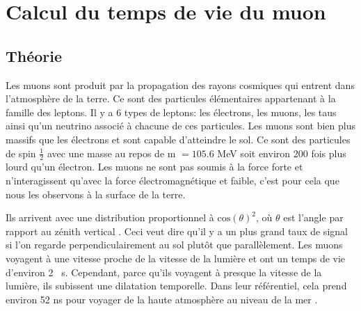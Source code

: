 \documentclass[12pt]{article}
\begin{document}
\begin{abstract}

La plupart des particules observées en dehors de notre atmosphère ont été crées par des sources galactiques, voir extra-galactiques. Si leurs énergies dépassent le  keV, celles-ci vont alors heurter la terre. La plupart des rayons cosmiques sont de nature hadronique et donc sensitifs à l'interaction forte. L'atmosphère terrestre est alors un vrai champ de mine pour ces particules qui sont susceptible d'interagir à tout moment produisant des gerbes de particules neutres et chargées. Puis, à leur tour, interagissent résultant en une pléthore de mésons chargées avec des temps de vie courts qui éventuellement se désintègrent en un grand nombre de muons de hautes énergies. À la surface de la terre, nous sommes bombardés par des muons de charges positives et négatives avec un taux d'environ une particule par \si{\cm\squared\per\min}. Dans cette expérience, nous allons nous intéresser à  ces particules cosmiques et nous allons mesurer leurs temps de vie ainsi leurs flux.

\end{abstract}

\newpage
\section{Calcul du temps de vie du muon}
\subsection{Théorie}

Les muons sont produit par la propagation des rayons cosmiques qui entrent dans l'atmosphère de la terre. Ce sont des particules élémentaires appartenant à la famille des leptons. Il y a 6 types de leptons: les électrons, les muons, les taus ainsi qu'un neutrino associé à chacune de ces particules. Les muons sont bien plus massifs que les électrons et sont capable d'atteindre le sol. Ce sont des particules de spin $\frac{1}{2}$ avec une masse au repos de m $=105.6$ MeV soit environ 200 fois plus lourd qu'un électron. Les muons ne sont pas soumis à la force forte et n'interagissent qu'avec la force électromagnétique et faible, c'est pour cela que nous les observons à la surface de la terre.

Ils arrivent avec une distribution proportionnel à $\text{cos}(\theta)^2$, où $\theta$ est l'angle par rapport au zénith vertical \cite{PhysRevD.98.030001}. Ceci veut dire qu'il y a un plus grand taux de signal si l'on regarde perpendiculairement au sol plutôt que parallèlement. Les muons voyagent à une vitesse proche de la vitesse de la lumière et ont un temps de vie d'environ 2 \si{\SIUnitSymbolMicro s}. Cependant, parce qu'ils voyagent à presque la vitesse de la lumière, ils subissent une dilatation temporelle. Dans leur référentiel, cela prend environ 52 ns pour voyager de la haute atmosphère au niveau de la mer \cite{vest_measuring_2010}.
\end{document}
